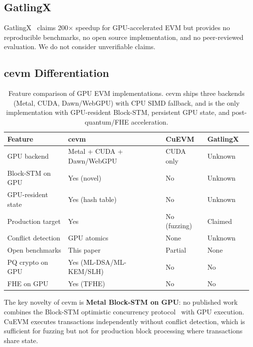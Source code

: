 \documentclass[11pt]{article}
\begin{document}
\subsection{GatlingX}

GatlingX~\cite{gatlingx} claims 200$\times$ speedup for GPU-accelerated EVM but provides
no reproducible benchmarks, no open source implementation, and no peer-reviewed evaluation.
We do not consider unverifiable claims.

\subsection{cevm Differentiation}

\begin{table}[h]
\centering
\small
\begin{tabular}{lllll}
\toprule
\textbf{Feature} & \textbf{cevm} & \textbf{CuEVM} & \textbf{GatlingX} \\
\midrule
GPU backend         & Metal + CUDA + Dawn/WebGPU & CUDA only     & Unknown \\
Block-STM on GPU    & Yes (novel)             & No               & Unknown \\
GPU-resident state  & Yes (hash table)        & No               & Unknown \\
Production target   & Yes                     & No (fuzzing)     & Claimed \\
Conflict detection  & GPU atomics             & None             & Unknown \\
Open benchmarks     & This paper              & Partial          & None \\
PQ crypto on GPU    & Yes (ML-DSA/ML-KEM/SLH) & No               & No \\
FHE on GPU          & Yes (TFHE)              & No               & No \\
\bottomrule
\end{tabular}
\caption{Feature comparison of GPU EVM implementations. cevm ships three backends
(Metal, CUDA, Dawn/WebGPU) with CPU SIMD fallback, and is the only implementation
with GPU-resident Block-STM, persistent GPU state, and post-quantum/FHE acceleration.}
\label{tab:gpu_comparison}
\end{table}

The key novelty of cevm is \textbf{Metal Block-STM on GPU}: no published work combines
the Block-STM optimistic concurrency protocol~\cite{blockstm} with GPU execution. CuEVM
executes transactions independently without conflict detection, which is sufficient for
fuzzing but not for production block processing where transactions share state.
\end{document}
